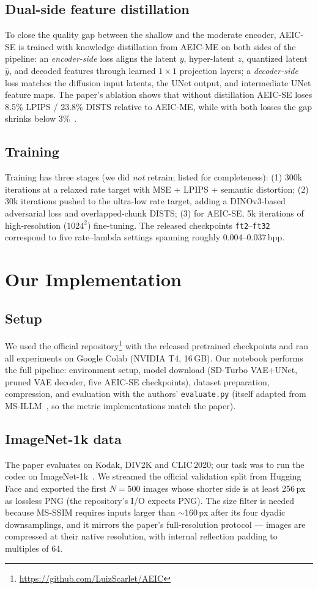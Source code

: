 \documentclass[conference]{IEEEtran}
\begin{document}
\subsection{Dual-side feature distillation}
To close the quality gap between the shallow and the moderate encoder, AEIC-SE is trained with
knowledge distillation from AEIC-ME on both sides of the pipeline: an \emph{encoder-side} loss
aligns the latent $y$, hyper-latent $z$, quantized latent $\hat y$, and decoded features through
learned $1\times1$ projection layers; a \emph{decoder-side} loss matches the diffusion input
latents, the UNet output, and intermediate UNet feature maps. The paper's ablation shows that
without distillation AEIC-SE loses 8.5\% LPIPS / 23.8\% DISTS relative to AEIC-ME, while with
both losses the gap shrinks below 3\%~\cite{aeic}.

\subsection{Training}
Training has three stages (we did \emph{not} retrain; listed for completeness):
(1) 300k iterations at a relaxed rate target with MSE + LPIPS + semantic distortion;
(2) 30k iterations pushed to the ultra-low rate target, adding a DINOv3-based adversarial loss
and overlapped-chunk DISTS;
(3) for AEIC-SE, 5k iterations of high-resolution ($1024^2$) fine-tuning.
The released checkpoints \texttt{ft2}--\texttt{ft32} correspond to five rate--lambda settings
spanning roughly 0.004--0.037\,bpp.

\section{Our Implementation}
\subsection{Setup}
We used the official repository\footnote{\url{https://github.com/LuizScarlet/AEIC}} with the
released pretrained checkpoints and ran all experiments on Google Colab (NVIDIA T4, 16\,GB).
Our notebook performs the full pipeline: environment setup, model download (SD-Turbo VAE+UNet,
pruned VAE decoder, five AEIC-SE checkpoints), dataset preparation, compression, and evaluation
with the authors' \texttt{evaluate.py} (itself adapted from MS-ILLM~\cite{msillm}, so the metric
implementations match the paper).

\subsection{ImageNet-1k data}
The paper evaluates on Kodak, DIV2K and CLIC\,2020; our task was to run the codec on
ImageNet-1k~\cite{imagenet}. We streamed the official validation split from Hugging Face and
exported the first $N{=}500$ images whose shorter side is at least 256\,px as lossless
PNG (the repository's I/O expects PNG). The size filter is needed because MS-SSIM requires
inputs larger than $\sim$160\,px after its four dyadic downsamplings, and it mirrors the paper's
full-resolution protocol --- images are compressed at their native resolution, with internal
reflection padding to multiples of 64.
\end{document}
